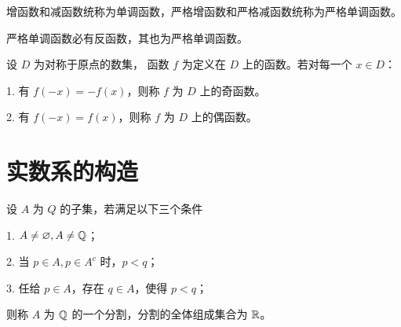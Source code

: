 增函数和减函数统称为单调函数，严格增函数和严格减函数统称为严格单调函数。

严格单调函数必有反函数，其也为严格单调函数。

\begin{definition}
	设 $D$ 为对称于原点的数集， 函数 $f$ 为定义在 $D$ 上的函数。若对每一个 $x\in D$：

	1. 有 $f(-x) = -f(x)$，则称 $f$ 为 $D$ 上的奇函数。

	2. 有 $f(-x) = f(x)$，则称 $f$ 为 $D$ 上的偶函数。
\end{definition}

\section{实数系的构造}

\begin{definition}[Dedekind 分割]
	设 $A$ 为 $Q$ 的子集，若满足以下三个条件

	1. $A \ne \varnothing,A \ne \mathbb{Q}$；

	2. 当 $p\in A,p \in A^c$ 时，$p<q$；

	3. 任给 $p \in A$，存在 $q \in A$，使得 $p<q$；

	则称 $A$ 为 $\mathbb{Q}$ 的一个分割，分割的全体组成集合为 $\mathbb{R}$。
\end{definition}

